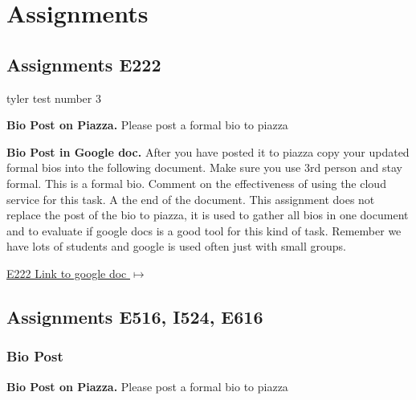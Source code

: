 

\chapter{Assignments}\label{c:assignments}

\section{Assignments E222}\label{s:e222-assignment}
\label{s:e222-assignments}

tyler test number 3

\begin{exercise}\label{E:bio-piazza}
{\bf Bio Post on Piazza.} Please post a formal bio to piazza
\end{exercise}
 
\begin{exercise} \label{E:bio-googledocs}

 {\bf Bio Post in Google doc.} After you have posted it to piazza copy your updated formal bios into the following document.  Make sure you use 3rd person and stay formal. This is a formal bio. Comment on the effectiveness of using the cloud service for this task. A the end of the document. This assignment does not replace the post of the bio to piazza, it is used to gather all bios in one document and to evaluate if google docs is a good tool for this kind of task. Remember we have lots of students and google is used often just with small groups.
 
 \smallskip

 {\hfill \href{https://docs.google.com/document/d/1ejzlKYqC3dLac8WXVpcPQsJh1j4BDqRxxgGg1cFQbeQ/edit?usp=sharing}{E222 Link to google doc $\mapsto$}}

 \end{exercise}


\section{Assignments E516, I524, E616}
\label{s:e516/524/616-assignments}

\subsection{Bio Post}\label{a:616-bio}

\begin{exercise}\label{E:bio-piazza}
{\bf Bio Post on Piazza.} Please post a formal bio to piazza
\end{exercise}

